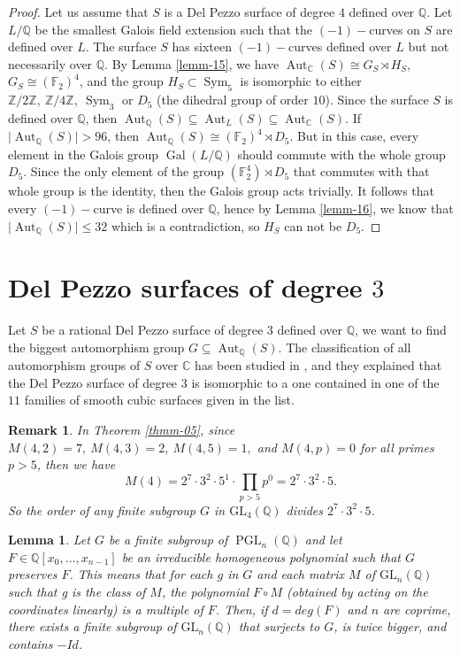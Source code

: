 \documentclass[leqno,12pt]{amsart} %
\newtheorem{lem}[thm]{Lemma}
\newtheorem{rmk}[thm]{Remark}
\newcommand{\Z}{\ensuremath{\mathbb{Z}}}
\newcommand{\Q}{\ensuremath{\mathbb{Q} }}
\newcommand{\F}{\ensuremath{\mathbb{F} }}
\newcommand{\C}{\ensuremath{\mathbb{C} }}
\DeclareMathOperator{\PGL}{PGL}
\DeclareMathOperator{\Aut}{Aut}
\DeclareMathOperator{\Gal}{Gal}
\DeclareMathOperator{\sym}{Sym}
\begin{document}
\begin{proof}
 Let us assume that $S$ is a Del Pezzo surface of degree $4$ defined over $\Q $. Let $L/\Q $ be the smallest Galois field extension such that the $(-1)-$curves on $S$ are defined over $L$. The surface $S$ has sixteen $(-1)-$curves defined over $L$ but not necessarily over $\Q $. By Lemma \ref{lemm-15}, we have $\Aut_{\C }(S)\cong G_S\rtimes H_S$, $G_S\cong (\F_2)^4$, and the group $H_S\subset \sym_5$ is isomorphic to either $\Z /2\Z ,~\Z / 4\Z ,~\sym_3$ or $D_5$ (the dihedral group of order $10$). Since the surface $S$ is defined over $\Q $, then $\Aut_{\Q }(S)\subseteq\Aut_{L}(S)\subseteq\Aut_{\C }(S)$. If $\mid \Aut_{\Q }(S)\mid > 96$, then $\Aut_{\Q }(S)\cong(\F _2)^4 \rtimes D_5$. But in this case, every element in the Galois group $\Gal(L/\Q )$ should commute with the whole group $D_5$. Since the only element of the group $(\F_2^4)\rtimes D_5$ that commutes with that whole group is the identity, then the Galois group acts trivially. It follows that every $(-1)-$curve is defined over $\Q $, hence by Lemma \ref{lemm-16}, we know that $\mid \Aut_{\Q }(S)\mid \le 32$ which is a contradiction, so $H_S$ can not be $D_5$.
\end{proof}
 
\section{\texorpdfstring{Del Pezzo surfaces of degree $3$}{Del Pezzo surfaces of degree 3}}
Let $S$ be a rational Del Pezzo surface of degree $3$ defined over $\Q $, we want to find the biggest automorphism group $G\subseteq\Aut_{\Q }(S)$. The classification of all automorphism groups of $S$ over $\C $ has been studied in \cite[Theorem 9.5.6]{MR2964027}, and they explained that the Del Pezzo surface of degree $3$ is isomorphic to a one contained in one of the $11$ families of smooth cubic surfaces given in the list.
\begin{rmk}\label{remk-05}
    In Theorem \ref{thmm-05}, since $M(4,2)=7,~M(4,3)=2,~M(4,5)=1,$ and $M(4,p)=0$ for all primes $p> 5$, then we have 
    \[M(4)=2^7\cdot 3^2\cdot5^1\cdot\prod_{p> 5} p^0=2^7\cdot 3^2\cdot5.\] 
    So the order of any finite subgroup $G$ in $\mathrm{GL}_4(\Q )$ divides $2^7\cdot 3^2\cdot5$.
\end{rmk}
 
\begin{lem}\label{lemm-30}
    Let $G$ be a finite subgroup of $\PGL _{n}(\Q )$ and let $F\in \Q [x_0,\ldots ,x_{n-1}]$ be an irreducible homogeneous polynomial such that $G$ preserves $F$. This means that for each $g$ in $G$ and each matrix $M $ of $ \mathrm{GL}_n(\Q )$ such that g is the class of $M$, the polynomial $F \circ M$ (obtained by acting on the coordinates linearly) is a multiple of $F$. Then, if $d=deg(F)$ and $n$ are coprime, there exists a finite subgroup of $\mathrm{GL}_{n}(\Q )$ that surjects to $G$, is twice bigger, and contains $-Id$.
\end{lem} 
 
\end{document}
